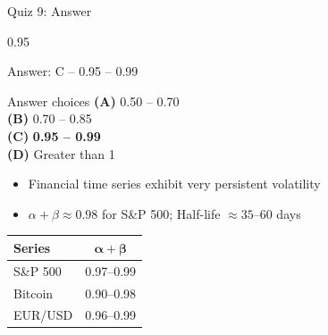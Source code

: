 \documentclass[9pt, aspectratio=169, t]{beamer}
\begin{document}
\begin{frame}{Quiz 9: Answer}
    \begin{cminipage}{0.95\textwidth}
    {\small
    \begin{exampleblock}{Answer: C -- 0.95 -- 0.99}

    \vspace{0.1cm}

    \begin{block}{Answer choices}
        \textcolor{MainBlue}{\textbf{(A)}} 0.50 -- 0.70 \incorrect\\[2pt]
        \textcolor{MainBlue}{\textbf{(B)}} 0.70 -- 0.85 \incorrect\\[2pt]
        \textcolor{MainBlue}{\textbf{(C)}} \textbf{\textcolor{Forest}{0.95 -- 0.99}} \correct\\[2pt]
        \textcolor{MainBlue}{\textbf{(D)}} Greater than 1 \incorrect
    \end{block}

        \vspace{0.1cm}

        {\footnotesize
        \begin{itemize}\setlength{\itemsep}{0pt}
            \item Financial time series exhibit very persistent volatility
            \item $\alpha + \beta \approx 0.98$ for S\&P 500; Half-life $\approx 35$--$60$ days
        \end{itemize}
        \begin{center}
            \begin{tabular}{lc}
                \toprule
                \textbf{Series} & $\bm{\alpha + \beta}$ \\
                \midrule
                S\&P 500 & 0.97--0.99 \\
                Bitcoin & 0.90--0.98 \\
                EUR/USD & 0.96--0.99 \\
                \bottomrule
            \end{tabular}
        \end{center}
        }
    \end{exampleblock}
    }

    \end{cminipage}
\end{frame}
\end{document}
